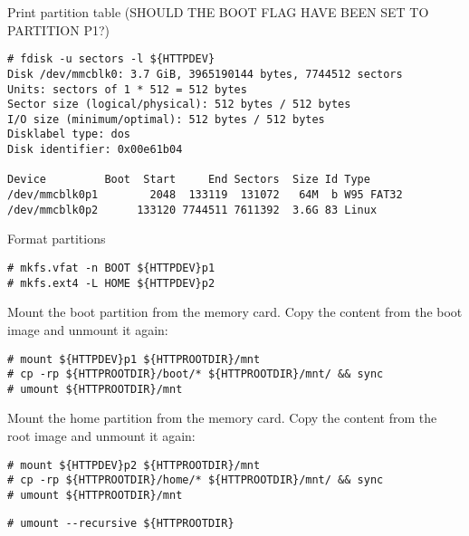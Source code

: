 Print partition table (SHOULD THE BOOT FLAG HAVE BEEN SET TO PARTITION P1?)
\begin{lstlisting}[]
# fdisk -u sectors -l ${HTTPDEV}
Disk /dev/mmcblk0: 3.7 GiB, 3965190144 bytes, 7744512 sectors
Units: sectors of 1 * 512 = 512 bytes
Sector size (logical/physical): 512 bytes / 512 bytes
I/O size (minimum/optimal): 512 bytes / 512 bytes
Disklabel type: dos
Disk identifier: 0x00e61b04

Device         Boot  Start     End Sectors  Size Id Type
/dev/mmcblk0p1        2048  133119  131072   64M  b W95 FAT32
/dev/mmcblk0p2      133120 7744511 7611392  3.6G 83 Linux
\end{lstlisting}
\FloatBarrier
\vspace{-5mm}

Format partitions
\begin{lstlisting}[]
# mkfs.vfat -n BOOT ${HTTPDEV}p1
# mkfs.ext4 -L HOME ${HTTPDEV}p2
\end{lstlisting}
\FloatBarrier
\vspace{-5mm}

Mount the boot partition from the memory card. Copy the content from the
boot image and unmount it again:
\begin{lstlisting}[]
# mount ${HTTPDEV}p1 ${HTTPROOTDIR}/mnt
# cp -rp ${HTTPROOTDIR}/boot/* ${HTTPROOTDIR}/mnt/ && sync
# umount ${HTTPROOTDIR}/mnt
\end{lstlisting}
\FloatBarrier
\vspace{-5mm}

Mount the home partition from the memory card. Copy the content from the
root image and unmount it again:
\begin{lstlisting}[]
# mount ${HTTPDEV}p2 ${HTTPROOTDIR}/mnt
# cp -rp ${HTTPROOTDIR}/home/* ${HTTPROOTDIR}/mnt/ && sync
# umount ${HTTPROOTDIR}/mnt
\end{lstlisting}
\FloatBarrier
\vspace{-5mm}


\begin{lstlisting}[]
# umount --recursive ${HTTPROOTDIR}
\end{lstlisting}
\FloatBarrier
\vspace{-5mm}




